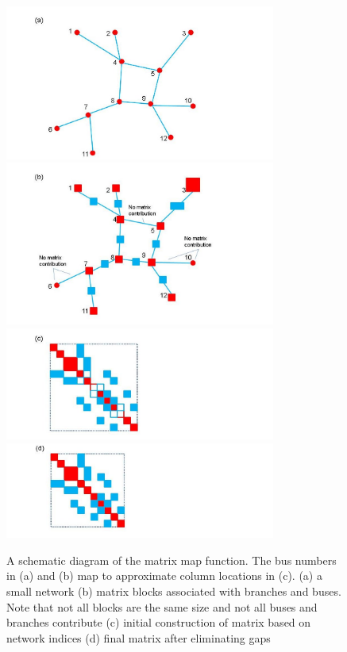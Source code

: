 \documentclass[preprint]{acm_proc_article-sp}
\begin{document}
\begin{figure}
\centering
\includegraphics[width=3.5in,keepaspectratio=true]{./Fig1a}
\includegraphics[width=3.5in,keepaspectratio=true]{./Fig1b}
\includegraphics[width=3.5in,keepaspectratio=true]{./Fig1c}
\includegraphics[width=3.5in,keepaspectratio=true]{./Fig1d}
\caption{\label{mapper} A schematic diagram of the matrix map function.
The bus numbers in (a) and (b) map to approximate column locations in (c).
(a) a small network (b)
matrix blocks associated with branches and buses. Note that not all blocks are
the same size and not all buses and branches contribute (c) initial construction
of matrix based on network indices (d) final matrix after eliminating gaps}
\end{figure}
\end{document}
